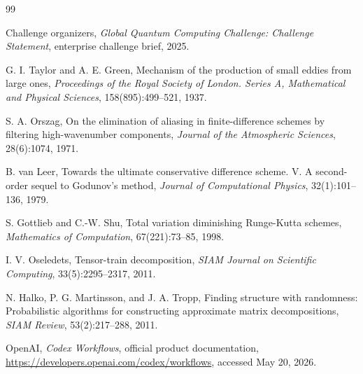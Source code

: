 \documentclass[11pt,a4paper]{article}
\begin{document}
\begin{thebibliography}{99}

Challenge organizers,
\newblock \emph{Global Quantum Computing Challenge: Challenge Statement},
\newblock enterprise challenge brief, 2025.

G. I. Taylor and A. E. Green,
\newblock Mechanism of the production of small eddies from large ones,
\newblock \emph{Proceedings of the Royal Society of London. Series A, Mathematical and Physical Sciences}, 158(895):499--521, 1937.

S. A. Orszag,
\newblock On the elimination of aliasing in finite-difference schemes by filtering high-wavenumber components,
\newblock \emph{Journal of the Atmospheric Sciences}, 28(6):1074, 1971.

B. van Leer,
\newblock Towards the ultimate conservative difference scheme. V. A second-order sequel to Godunov's method,
\newblock \emph{Journal of Computational Physics}, 32(1):101--136, 1979.

S. Gottlieb and C.-W. Shu,
\newblock Total variation diminishing Runge-Kutta schemes,
\newblock \emph{Mathematics of Computation}, 67(221):73--85, 1998.

I. V. Oseledets,
\newblock Tensor-train decomposition,
\newblock \emph{SIAM Journal on Scientific Computing}, 33(5):2295--2317, 2011.

N. Halko, P. G. Martinsson, and J. A. Tropp,
\newblock Finding structure with randomness: Probabilistic algorithms for constructing approximate matrix decompositions,
\newblock \emph{SIAM Review}, 53(2):217--288, 2011.

OpenAI,
\newblock \emph{Codex Workflows},
\newblock official product documentation, \url{https://developers.openai.com/codex/workflows}, accessed May 20, 2026.

\end{thebibliography}
\end{document}
